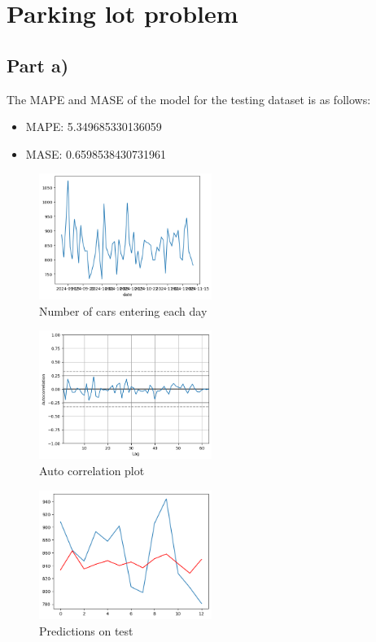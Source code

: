 \section{Parking lot problem}
\subsection{Part a)}
The MAPE and MASE of the model for the testing dataset is as follows:
\begin{itemize}[noitemsep]
	\item MAPE:  5.349685330136059
	\item MASE:  0.6598538430731961
\end{itemize}
\begin{figure}[h]
	\centering
	\includegraphics[width=0.5\textwidth]{1a_plot1.png}
	\caption{Number of cars entering each day}
\end{figure}

\begin{figure}[h]
	\centering
	\includegraphics[width=0.5\textwidth]{1a_ac_plot.png}
	\caption{Auto correlation plot}
\end{figure}

\begin{figure}[h]
	\centering
	\includegraphics[width=0.5\textwidth]{1a_predictions.png}
	\caption{Predictions on test}
\end{figure}

